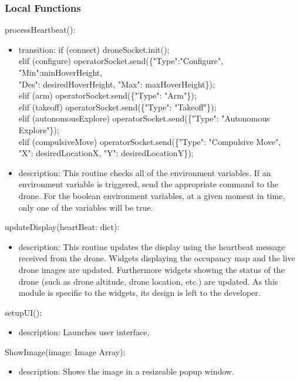 \documentclass[12pt, titlepage]{article}
\begin{document}
\subsubsection{Local Functions}
\noindent processHeartbeat():
\begin{itemize}
\item transition:
if (connect) droneSocket.init();\\
elif (configure) operatorSocket.send(\{"Type":"Configure", "Min":minHoverHeight, \\"Des": desiredHoverHeight, "Max": maxHoverHeight\});\\
 elif (arm) operatorSocket.send(\{"Type": "Arm"\});\\
 elif (takeoff) operatorSocket.send(\{"Type": "Takeoff"\});\\
 elif (autonomousExplore) operatorSocket.send(\{"Type": "Autonomous Explore"\});\\
 elif (compulsiveMove) operatorSocket.send(\{"Type": "Compulsive Move", \\ "X": desiredLocationX, "Y": desiredLocationY\});\\
\item description: This routine checks all of the environment variables. If an environment variable is triggered, send the appropriate command to the drone. For the boolean environment variables, at a given moment in time, only one of the variables will be true.
\end{itemize}

\noindent updateDisplay(heartBeat: dict):
\begin{itemize}
\item description: This routine updates the display using the heartbeat message received from the drone. Widgets displaying the occupancy map and the live drone images are updated. Furthermore widgets showing the status of the drone (such as drone altitude, drone location, etc.) are updated. As this module is specific to the widgets, its design is left to the developer.
\end{itemize}
\noindent setupUI():
\begin{itemize}
\item description: Launches user interface.
\end{itemize}
\noindent ShowImage(image: Image Array):
\begin{itemize}
\item description: Shows the image in a resizeable popup window.
\end{itemize}
\newpage
\end{document}
